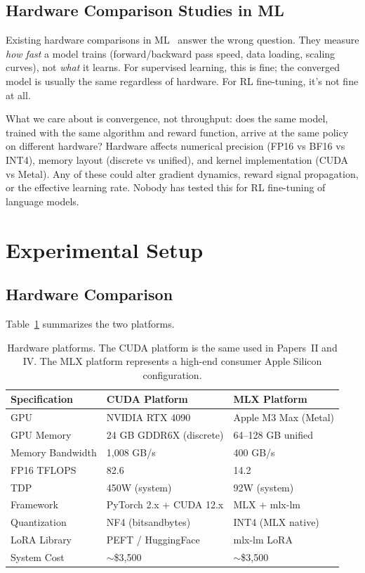 \documentclass[11pt]{article}
\begin{document}
\subsection{Hardware Comparison Studies in ML}

Existing hardware comparisons in ML~\citep{mattson2020mlperf} answer the wrong question.  They measure \emph{how fast} a model trains (forward/backward pass speed, data loading, scaling curves), not \emph{what} it learns.  For supervised learning, this is fine; the converged model is usually the same regardless of hardware.  For RL fine-tuning, it's not fine at all.

What we care about is convergence, not throughput: does the same model, trained with the same algorithm and reward function, arrive at the same policy on different hardware?  Hardware affects numerical precision (FP16 vs BF16 vs INT4), memory layout (discrete vs unified), and kernel implementation (CUDA vs Metal).  Any of these could alter gradient dynamics, reward signal propagation, or the effective learning rate.  Nobody has tested this for RL fine-tuning of language models.


\section{Experimental Setup}

\subsection{Hardware Comparison}

Table~\ref{tab:hardware} summarizes the two platforms.

\begin{table}[t]
\centering
\caption{Hardware platforms.  The CUDA platform is the same used in Papers~II and IV.  The MLX platform represents a high-end consumer Apple Silicon configuration.}
\label{tab:hardware}
\begin{tabular}{l l l}
\toprule
\textbf{Specification} & \textbf{CUDA Platform} & \textbf{MLX Platform} \\
\midrule
GPU & NVIDIA RTX 4090 & Apple M3 Max (Metal) \\
GPU Memory & 24 GB GDDR6X (discrete) & 64--128 GB unified \\
Memory Bandwidth & 1{,}008 GB/s & 400 GB/s \\
FP16 TFLOPS & 82.6 & 14.2 \\
TDP & 450W (system) & 92W (system) \\
Framework & PyTorch 2.x + CUDA 12.x & MLX + mlx-lm \\
Quantization & NF4 (bitsandbytes) & INT4 (MLX native) \\
LoRA Library & PEFT / HuggingFace & mlx-lm LoRA \\
System Cost & $\sim$\$3{,}500 & $\sim$\$3{,}500 \\
\bottomrule
\end{tabular}
\end{table}
\end{document}
